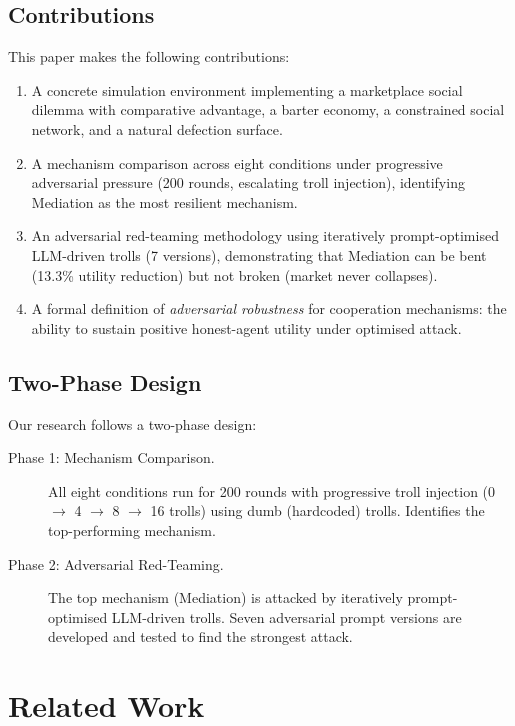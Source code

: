 \documentclass{article}
\begin{document}
\subsection{Contributions}

This paper makes the following contributions:

\begin{enumerate}
  \item A concrete simulation environment implementing a marketplace social dilemma with comparative advantage, a barter economy, a constrained social network, and a natural defection surface.
  \item A mechanism comparison across eight conditions under progressive adversarial pressure (200 rounds, escalating troll injection), identifying Mediation as the most resilient mechanism.
  \item An adversarial red-teaming methodology using iteratively prompt-optimised LLM-driven trolls (7 versions), demonstrating that Mediation can be bent (13.3\% utility reduction) but not broken (market never collapses).
  \item A formal definition of \textit{adversarial robustness} for cooperation mechanisms: the ability to sustain positive honest-agent utility under optimised attack.
\end{enumerate}

\subsection{Two-Phase Design}

Our research follows a two-phase design:

\begin{description}
  \item[Phase 1: Mechanism Comparison.] All eight conditions run for 200 rounds with progressive troll injection (0 $\to$ 4 $\to$ 8 $\to$ 16 trolls) using dumb (hardcoded) trolls. Identifies the top-performing mechanism.
  \item[Phase 2: Adversarial Red-Teaming.] The top mechanism (Mediation) is attacked by iteratively prompt-optimised LLM-driven trolls. Seven adversarial prompt versions are developed and tested to find the strongest attack.
\end{description}

\section{Related Work}
\label{sec:related}
\end{document}
